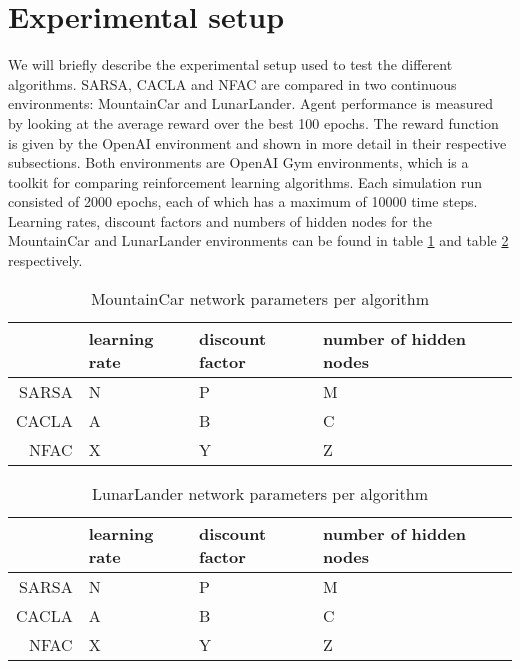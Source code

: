
\section{Experimental setup}

We will briefly describe the experimental setup used to test the different algorithms. SARSA, CACLA and NFAC are compared in two continuous environments: MountainCar\cite{openaimountaincar} and LunarLander\cite{openailunarlander}. Agent performance is measured by looking at the average reward over the best 100 epochs. The reward function is given by the OpenAI environment and shown in more detail in their respective subsections. Both environments are OpenAI Gym environments\cite{openaigym}, which is a toolkit for comparing reinforcement learning algorithms. Each simulation run consisted of 2000 epochs, each of which has a maximum of 10000 time steps. Learning rates, discount factors and numbers of hidden nodes for the MountainCar and LunarLander environments can be found in table \ref{tab:mntparam} and table \ref{tab:lunarparam} respectively. 

\begin{table}
\centering
\label{tab:mntparam}
\begin{tabular}{r|llll}
                     & learning rate & discount factor & number of hidden nodes \\\hline
SARSA & N          & P               & M         \\
CACLA & A          & B               & C         \\
NFAC    & X          & Y              & Z         
\end{tabular}
\caption{MountainCar network parameters per algorithm}
\end{table}

\begin{table}
\centering
\label{tab:lunarparam}
\begin{tabular}{r|llll}
                     & learning rate & discount factor & number of hidden nodes \\\hline
SARSA & N          & P               & M         \\
CACLA & A          & B               & C         \\
NFAC    & X          & Y              & Z         
\end{tabular}
\caption{LunarLander network parameters per algorithm}
\end{table}



